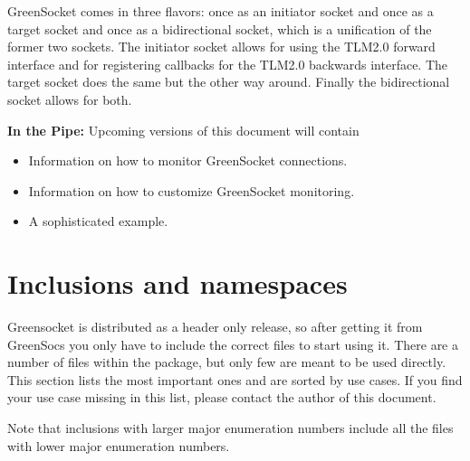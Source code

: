 \documentclass[a4paper,10pt]{article}          %
\begin{document}
GreenSocket comes in three flavors: once as an initiator socket and once as a target socket and once as a bidirectional socket, which is a unification of the former two sockets. The initiator socket allows for using the TLM2.0 forward interface and for registering callbacks for the TLM2.0 backwards interface. The target socket does the same but the other way around. Finally the bidirectional socket allows for both.

\textbf{In the Pipe:} Upcoming versions of this document will contain
\begin{itemize}
\item Information on how to monitor GreenSocket connections.
\item Information on how to customize GreenSocket monitoring.
\item A sophisticated example.
\end{itemize}


\section{Inclusions and namespaces}
Greensocket is distributed as a header only release, so after getting it from GreenSocs you only have to include the correct files to start using it. There are a number of files within the package, but only few are meant to be used directly. This section lists the most important ones and are sorted by use cases. If you find your use case missing in this list, please contact the author of this document.

Note that inclusions with larger major enumeration numbers include all the files with lower major enumeration numbers.
\end{document}
